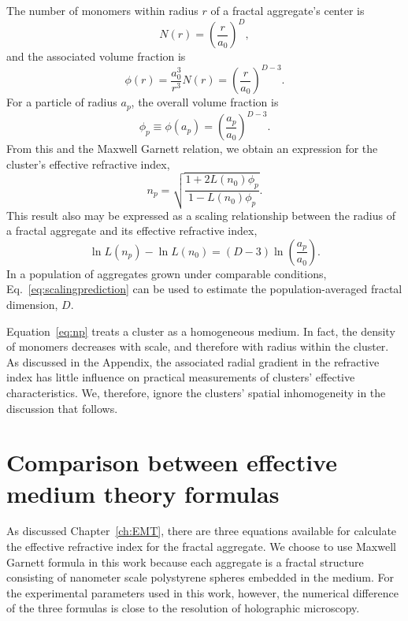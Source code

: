 The number of monomers within radius $r$ of a fractal aggregate's
center is
\begin{equation}
  \label{eq:number}
  N(r) = \left(\frac{r}{a_0}\right)^D, 
\end{equation}
and the associated volume fraction is
\begin{equation}
  \label{eq:internalvolumefraction}
  \phi(r) = \frac{a_0^3}{r^3} N(r) = \left(\frac{r}{a_0}\right)^{D-3}.
\end{equation}
For a particle of radius $a_p$, the overall volume fraction is
\begin{equation}
  \label{eq:volumefraction}
  \phi_p \equiv \phi(a_p) = \left(\frac{a_p}{a_0}\right)^{D-3}.
\end{equation}
From this and the Maxwell Garnett relation, we obtain an
expression for the cluster's effective refractive index,
\begin{equation}
  \label{eq:np}
  n_p
  =
  \sqrt{
    \frac{1 + 2 L(n_0) \phi_p}{1 - L(n_0) \phi_p}
  }.
\end{equation}
This result also may be expressed as a scaling 
relationship between the radius of a fractal aggregate and 
its effective refractive index,
\begin{equation}
  \label{eq:scalingprediction}
  \ln L(n_p) - \ln L(n_0)
  =
  (D - 3) 
  \ln\left(\frac{a_p}{a_0}\right).
\end{equation}
In a population of aggregates grown under comparable
conditions, Eq.~\eqref{eq:scalingprediction}
can be used to estimate the population-averaged
fractal dimension, $D$.

Equation~\eqref{eq:np} treats a cluster as a
homogeneous medium.  In fact, the density of monomers
decreases with scale, and therefore with radius within the
cluster.  As discussed in the Appendix, the associated 
radial gradient in the refractive index has little influence 
on practical measurements of clusters' effective characteristics.
We, therefore, ignore the clusters' 
spatial inhomogeneity in the discussion that follows.

\section{Comparison between effective medium theory formulas}

As discussed Chapter~\ref{ch:EMT}, there are three equations available for calculate the  effective refractive index for the fractal aggregate. We choose to use Maxwell Garnett formula in this work because each aggregate is a fractal structure consisting of nanometer scale polystyrene spheres embedded in the medium. For the experimental parameters used in this work, however, the numerical difference of the three formulas is close to the resolution of holographic microscopy. 

